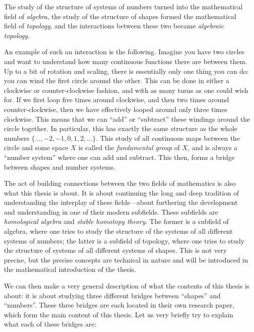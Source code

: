 The study of the structure of systems of numbers turned into the mathematical field of \emph{algebra}, the study of the structure of shapes formed the mathematical field of \emph{topology}, and the interactions between these two became \emph{algebraic topology}. 

An example of such an interaction is the following. Imagine you have two circles and want to understand how many continuous functions there are between them. Up to a bit of rotation and scaling, there is essentially only one thing you can do: you can wind the first circle around the other. This can be done in either a clockwise or counter-clockwise fashion, and with as many turns as one could wish for. If we first loop five times around clockwise, and then two times around counter-clockwise, then we have effectively looped around only three times clockwise. This means that we can ``add'' or ``subtract'' these windings around the circle together. In particular, this has exactly the same structure as the whole numbers $\{\ldots,-2, -1, 0, 1, 2,\ldots\}$. This study of all continuous maps between the circle and some space $X$ is called the \emph{fundamental group} of $X$, and is always a ``number system'' where one can add and subtract. This then, forms a bridge between shapes and number systems. 

The act of building connections between the two fields of mathematics is also what this thesis is about. It is about continuing the long and deep tradition of understanding the interplay of these fields---about furthering the development and understanding in one of their modern subfields. These subfields are \emph{homological algebra} and \emph{stable homotopy theory}. The former is a subfield of algebra, where one tries to study the structure of the systems of all different systems of numbers; the latter is a subfield of topology, where one tries to study the structure of systems of all different systems of shapes. This is not very precise, but the precise concepts are technical in nature and will be introduced in the mathematical introduction of the thesis. 

We can then make a very general description of what the contents of this thesis is about: it is about studying three different bridges between ``shapes'' and ``numbers''. These three bridges are each located in their own research paper, which form the main content of this thesis. Let us very briefly try to explain what each of these bridges are: 

